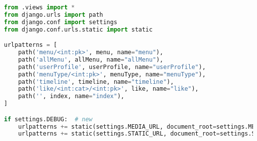 \begin{lstlisting}[language=Python]
from .views import *
from django.urls import path
from django.conf import settings
from django.conf.urls.static import static

urlpatterns = [
    path('menu/<int:pk>', menu, name="menu"),
    path('allMenu', allMenu, name="allMenu"),
    path('userProfile', userProfile, name="userProfile"),
    path('menuType/<int:pk>', menuType, name="menuType"),
    path('timeline', timeline, name="timeline"),
    path('like/<int:cat>/<int:pk>', like, name="like"),
    path('', index, name="index"),
]

if settings.DEBUG:  # new
    urlpatterns += static(settings.MEDIA_URL, document_root=settings.MEDIA_ROOT)
    urlpatterns += static(settings.STATIC_URL, document_root=settings.STATIC_ROOT)
    
\end{lstlisting}